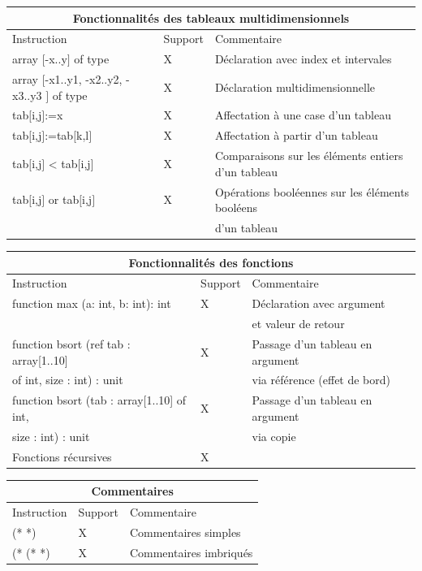 \documentclass[a4paper]{article}
\begin{document}
\begin{center}
\begin{tabular}{|l|l|l|}
  \hline
  \multicolumn{3}{|c|}{Fonctionnalités des tableaux multidimensionnels} \\
  \hline
  Instruction & Support & Commentaire \\
  \hline
  array $[$-x..y$]$ of type & X & Déclaration avec index et intervales \\
  array $[$-x1..y1, -x2..y2, -x3..y3 $]$ of type & X & Déclaration multidimensionnelle \\
  tab$[$i,j$]$:=x & X & Affectation à une case d'un tableau \\
  tab$[$i,j$]$:=tab$[$k,l$]$ & X & Affectation à partir d'un tableau \\
  tab$[$i,j$]$ < tab$[$i,j$]$ & X & Comparaisons sur les éléments entiers d'un tableau \\
  tab$[$i,j$]$ or tab$[$i,j$]$ & X & Opérations booléennes sur les éléments booléens \\ & & d'un tableau \\
  \hline
\end{tabular}

\begin{tabular}{|l|l|l|}
  \hline
  \multicolumn{3}{|c|}{Fonctionnalités des fonctions} \\
  \hline
  Instruction & Support & Commentaire \\
  \hline
  function max (a: int, b: int): int  & X & Déclaration avec argument\\
  & & et valeur de retour \\
  function bsort (ref tab : array[1..10] & X & Passage d'un tableau en argument \\
  of int, size : int) : unit  & & via référence (effet de bord)\\
  function bsort (tab : array[1..10] of int, & X & Passage d'un tableau en argument \\
   size : int) : unit  & & via copie \\
  Fonctions récursives & X & \\
  \hline
\end{tabular}

\begin{tabular}{|l|l|l|}
  \hline
  \multicolumn{3}{|c|}{Commentaires} \\
  \hline
  Instruction & Support & Commentaire \\
  \hline
  (* *) & X & Commentaires simples \\
  (* (* *) & X & Commentaires imbriqués \\
  \hline
\end{tabular}


\end{center}
\end{document}
